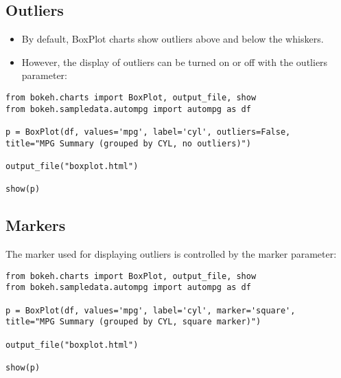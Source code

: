 \documentclass[a4paper,12pt]{article}
\begin{document}
\subsection{Outliers}
\begin{itemize}
\item By default, BoxPlot charts show outliers above and below the whiskers. 
\item However, the display of outliers can be turned on or off with the outliers parameter:
\end{itemize}


\begin{framed}
\begin{verbatim}
from bokeh.charts import BoxPlot, output_file, show
from bokeh.sampledata.autompg import autompg as df

p = BoxPlot(df, values='mpg', label='cyl', outliers=False,
title="MPG Summary (grouped by CYL, no outliers)")

output_file("boxplot.html")

show(p)
\end{verbatim}
\end{framed}

\subsection{Markers}
The marker used for displaying outliers is controlled by the marker parameter:
\begin{framed}
	\begin{verbatim}
from bokeh.charts import BoxPlot, output_file, show
from bokeh.sampledata.autompg import autompg as df

p = BoxPlot(df, values='mpg', label='cyl', marker='square',
title="MPG Summary (grouped by CYL, square marker)")

output_file("boxplot.html")

show(p)
\end{verbatim}
\end{framed}
\end{document}
